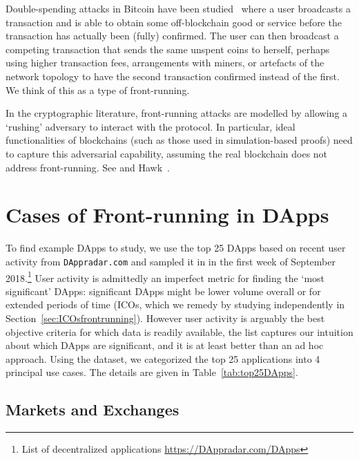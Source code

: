 Double-spending attacks in Bitcoin have been studied~\cite{bamert2013have, karame2012double} where a user broadcasts a transaction and is able to obtain some off-blockchain good or service before the transaction has actually been (fully) confirmed. The user can then broadcast a competing transaction that sends the same unspent coins to herself, perhaps using higher transaction fees, arrangements with miners, or artefacts of the network topology to have the second transaction confirmed instead of the first. We think of this as a type of front-running.

In the cryptographic literature, front-running attacks are modelled by allowing a `rushing' adversary to interact with the protocol. In particular, ideal functionalities of blockchains (such as those used in simulation-based proofs) need to capture this adversarial capability, assuming the real blockchain does not address front-running. See \eg {} and Hawk~\cite{kosba2016hawk}.


\section{Cases of Front-running in DApps}  


To find example DApps to study, we use the top 25 DApps based on recent user activity from \texttt{DAppradar.com} and sampled it in in the first week of September 2018.\footnote{List of decentralized applications \url{https://DAppradar.com/DApps}} User activity is admittedly an imperfect metric for finding the `most significant' DApps: significant DApps might be lower volume overall or for extended periods of time (\eg ICOs, which we remedy by studying independently in Section~\ref{sec:ICOsfrontrunning}). However user activity is arguably the best objective criteria for which data is readily available, the list captures our intuition about which DApps are significant, and it is at least better than an ad hoc approach. Using the dataset, we categorized the top 25 applications into 4 principal use cases. The details are given in Table~\ref{tab:top25DApps}.


\subsection{Markets and Exchanges} \label{sec:frontrunningExchanges}

